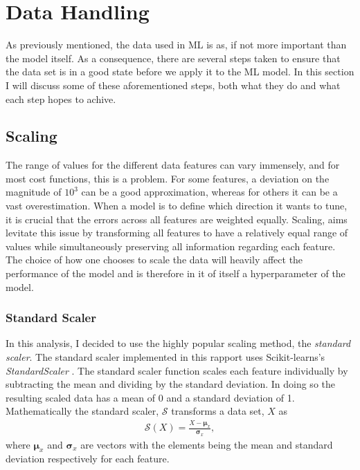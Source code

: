 \section{Data Handling}\label{subsec:Scaling}
As previously mentioned, the data used in \ac{ML} is as, if not more important than the model itself. 
As a consequence, there are several steps taken to ensure that the data set is in a good state before 
we apply it to the \ac{ML} model. In this section I will discuss some of these aforementioned steps, both 
what they do and what each step hopes to achive.
\subsection{Scaling}
The range of values for the different data features can vary immensely, and for most 
cost functions, this is a problem. For some features, a deviation on the magnitude 
of $10^3$ can be a good approximation, whereas for others it can be a vast 
overestimation. When a model is to define which direction it wants to tune, it is 
crucial that the errors across all features are weighted equally. Scaling, aims levitate 
this issue by transforming all features to have a relatively equal range of values while
simultaneously preserving all information regarding each feature. The choice of how one 
chooses to scale the data will heavily affect the performance of the model and is therefore
in it of itself a hyperparameter of the model. 
\subsubsection{Standard Scaler}\label{subsubsec:StandardScalar}
In this analysis, I decided to use the highly popular scaling method, the \emph{standard scaler}. 
The standard scaler implemented in this rapport uses Scikit-learns's \emph{StandardScaler}
\cite{StandardScaler}. The standard scaler function scales each feature individually by subtracting 
the mean and dividing by the standard deviation. In doing so the resulting scaled data has a mean 
of 0 and a standard deviation of 1. Mathematically the standard scaler, $\mathcal{S}$ transforms 
a data set, $X$ as 
\begin{align}
    \mathcal{S} \left(X\right) = \frac{X - \boldsymbol{\mu} _x}{\boldsymbol{\sigma}_x} ,
\end{align}
where $\boldsymbol{\mu} _x$ and $\boldsymbol{\sigma}_x$ are vectors with the elements being 
the mean and standard deviation respectively for each feature.
